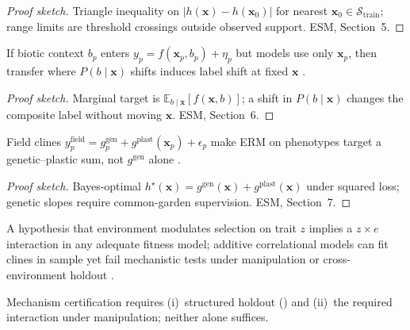 \documentclass[11pt]{article}
\begin{document}
\begin{proof}[Proof sketch]
Triangle inequality on $|h(\mathbf{x})-h(\mathbf{x}_0)|$ for nearest
$\mathbf{x}_0\in\mathcal{S}_{\mathrm{train}}$; range limits are threshold
crossings outside observed support.  ESM, Section~5.
\end{proof}

\begin{proposition}
\label{prop:hidden-context}
If biotic context $b_p$ enters $y_p=f(\mathbf{x}_p,b_p)+\eta_p$ but models
use only $\mathbf{x}_p$, then transfer where $P(b\mid\mathbf{x})$ shifts
induces label shift at fixed $\mathbf{x}$ \citep{soberon2007,koh2021}.
\end{proposition}

\begin{proof}[Proof sketch]
Marginal target is $\mathbb{E}_{b\mid\mathbf{x}}[f(\mathbf{x},b)]$; a shift in
$P(b\mid\mathbf{x})$ changes the composite label without moving $\mathbf{x}$.
ESM, Section~6.
\end{proof}

\begin{proposition}
\label{prop:plasticity}
Field clines $y^{\mathrm{field}}_{p}=g^{\mathrm{gen}}_{p}+g^{\mathrm{plast}}
(\mathbf{x}_p)+\epsilon_{p}$ make ERM on phenotypes target a genetic--plastic
sum, not $g^{\mathrm{gen}}$ alone \citep{via1985,stillwell2010}.
\end{proposition}

\begin{proof}[Proof sketch]
Bayes-optimal $h^\star(\mathbf{x})=g^{\mathrm{gen}}(\mathbf{x})+
g^{\mathrm{plast}}(\mathbf{x})$ under squared loss; genetic slopes require
common-garden supervision.  ESM, Section~7.
\end{proof}

\begin{theorem}
\label{thm:mechanism}
A hypothesis that environment modulates selection on trait $z$ implies a
$z \times e$ interaction in any adequate fitness model; additive
correlational models can fit clines in sample yet fail mechanistic tests
under manipulation or cross-environment holdout \citep{lande1983,stillwell2008}.
\end{theorem}

\begin{theorem}
\label{thm:two-test}
Mechanism certification requires (i)~structured holdout (\Etwo) and
(ii)~the required interaction under manipulation; neither alone suffices.
\end{theorem}
\end{document}
